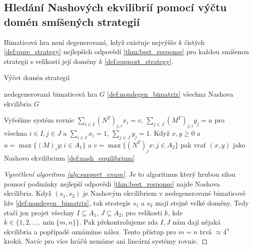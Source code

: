 \subsection{Hledání Nashových ekvilibrií pomocí výčtu domén smíšených strategií}
\begin{definition}
\label{def:nondegen_bimatrix}
Bimaticová hra není degenerovaná, když existuje nejvýšše $k$ čistých \ref{def:pure_strategy} nejlepších odpovědí \ref{thm:best_response} pro každou smíšenou strategii s velikostí její domény $k$ \ref{def:support_strategy}.
\end{definition}
\begin{algorithm}
    \algrenewcommand{}
    \algrenewcommand{}
    \caption{Výčet domén strategií}
    \label{alg:support_enum}
    \begin{algorithmic}[1]
        \Require  nedegenerovaná bimaticová hra $G$ \ref{def:nondegen_bimatrix}
        \Ensure  všechna Nashova ekvilibria $G$
        
            \State Vyřešíme systém rovnic $\sum_{i\in I} (N^T)_{j,i} x_i = v$, $\sum_{j\in J} (M^T)_{j,i} y_j = u$ pro všechna $i\in I, j\in J$ a $\sum_{i \in I} x_i = 1$, $\sum_{j \in J} y_j = 1$.
            \State Když $x,y\geq 0$ a $u = \max\{(M)_{i}y: i \in A_1\}$ a $v = \max\{(N^T)_{j}x: j \in A_2\}$ pak vrať $(x,y)$ jako Nashovo ekvilibrium \ref{def:nash_equilibrium}
        \EndFor
    \end{algorithmic}
\end{algorithm}

\begin{proof}[Vysvětlení algoritmu \ref{alg:support_enum}]
    Je to algoritmus který hrubou silou pomocí podmínky nejlepší odpovědi \ref{thm:best_response} najde Nashova ekvilibria. 
Když $(s_1,s_2)$ je Nashovým ekvilibriem v nedegenerované bimaticové hře \ref{def:nondegen_bimatrix}, tak strategie $s_1$ a $s_2$ mají stejně velké domény. 
Tedy stačí jen projet všechny $I\subseteq A_1$, $J \subseteq A_2$, pro velikosti $k$, kde $k \in \{1,2,\dots, \min\{m,n\}\}$. 
Pak překontrolujeme zda $I,J$ nám dají nějaká ekvilibria a popřípadě oznámíme nález. 
Tento přístup pro $m = n$ trvá $\approx 4^n$ kroků. 
Navíc pro více hráčů nemáme ani lineární systémy rovnic. 
\end{proof}


